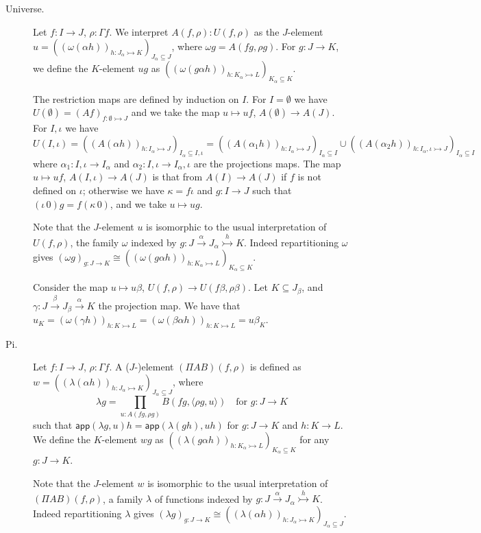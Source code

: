 \documentclass[english]{PaperTools/latex/lipics}
\def\app#1#2{\mathsf{app}(#1,#2)}
\begin{document}
\bigskip
\begin{description}
  \item[\sc Universe.]
    Let $f : I → J$, $ρ : Γf$.  We interpret $A(f,ρ) : U(f,ρ)$ as the
    $J$-element $u = \left(\left(ω(αh)\right)_{h : J_α ↣ K}\right)_{J_α ⊆ J}$,
    where $ωg = A(fg,ρg)$.
    For $g : J → K$, we define the $K$-element $u g$ as
    $\left(\left(ω(gαh)\right)_{h : K_α ↣ L}\right)_{K_α ⊆ K}$.

    The restriction maps are defined by induction on $I$.
    For $I = ∅$ we have $U(∅) = (Af)_{f:∅ ↣ J}$ and we take the map
    $u ↦ uf$, $A(∅) → A(J)$.
    For $I,ι$ we have $U(I,ι) = \left(\left(A(αh)\right)_{h : I_α ↣ J}\right)_{I_α ⊆ I,ι}
    = \left(\left(A(α_1h)\right)_{h : I_α ↣ J}\right)_{I_α ⊆ I} ∪
      \left(\left(A(α_2h)\right)_{h : I_α,ι ↣ J}\right)_{I_α ⊆ I}$
    where $α_1 : I,ι → I_α$ and $α_2 : I,ι → I_α,ι$ are the projections
    maps.
    The map $u ↦ uf$, $A(I,ι) → A(J)$ is
    that from $A(I) → A(J)$ if $f$ is not defined on $ι$; otherwise
    we have $κ = fι$ and $g : I→J$ such that $(ι\,0)g = f(κ\,0)$, and we
    take $u ↦ ug$.

    Note that the $J$-element $u$ is isomorphic to the usual interpretation of
    $U(f,ρ)$, the family $ω$ indexed by $g : J \stackrel{α}{→} J_α \stackrel {h}{↣} K$.
    Indeed repartitioning $ω$ gives
    $\left(ωg\right)_{g : J → K} ≅ \left(\left(ω(gαh)\right)_{h : K_α ↣ L}\right)_{K_α ⊆ K}$.

    Consider the map $u ↦ uβ$, $U(f,ρ) → U(fβ,ρβ)$.  Let
    $K ⊆ J_β$, and $γ : J \stackrel{β}{→} J_β \stackrel{α}{→} K$ the projection map.
    We have that
    $u_K = \left(ω(γh)\right)_{h : K ↣ L}
         = \left(ω(βαh)\right)_{h : K ↣ L}
         = uβ_K$.

  \item[\sc Pi.]
    Let $f : I → J$, $ρ : Γf$.  A ($J$-)element $(Π A B)(f,ρ)$ is defined as
    $w = \left(\left(λ(αh)\right)_{h : J_α ↣ K}\right)_{J_α ⊆ J}$,
    where
    $$λ g = \prod_{u : A(fg,ρg)} B(fg,⟨ρg,u⟩) \quad\text{for $g : J → K$}$$
    such that
    $\app{λg} u h = \app{λ(gh)}{uh}$ for $g : J → K$ and $h : K → L$.
    We define the $K$-element $w g$ as
    $\left(\left(λ(gαh)\right)_{h : K_α ↣ L}\right)_{K_α ⊆ K}$ for any $g : J → K$.

    Note that the $J$-element $w$ is isomorphic to the usual interpretation
    of $(ΠAB)(f,ρ)$, a family $λ$ of functions indexed by
    $g : J \stackrel{α}{→} J_α \stackrel {h}{↣} K$.  Indeed repartitioning $λ$ gives
    $\left(λg\right)_{g : J → K} ≅ \left(\left(λ(αh)\right)_{h : J_α ↣ K}\right)_{J_α ⊆ J}$.


\end{description}
\end{document}
